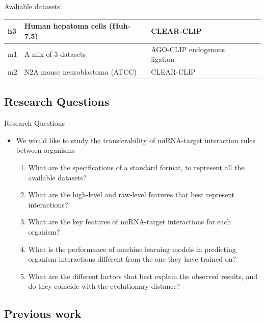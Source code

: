 \documentclass{beamer}
\begin{document}
\begin{frame}{Avaliable datasets}
\begin{table}[h!]
{\begin{tabular}{|l|p{5cm}|p{4cm}|l|}
    h3 &
	Human hepatoma cells (Huh-7.5) & 
	CLEAR-CLIP & 
	\cite{darnell_moore2015mirna} \\
	\hline
	
    m1 &
	A mix of 3 datasets & 
	AGO-CLIP endogenous ligation & 
	\cite{grosswendt2014unambiguous} \\
	\hline
	
    m2 &
	N2A mouse neuroblastoma (ATCC) & 
	CLEAR-CLIP & 
	\cite{darnell_moore2015mirna} \\
	\hline
\end{tabular}}
\end{table}


\end{frame}

\subsection{Research Questions}

\begin{frame}{Research Questions}
	\begin{itemize}

\item We would like to study the transferability of miRNA-target interaction rules between organisms
\begin{enumerate}
\item What are the specifications of a standard format, to represent all the available datasets?
\item What are the high-level and raw-level features that best represent interactions?
\item What are the key features of miRNA-target interactions for each organism?
\item What is the performance of machine learning models in predicting organism interactions different from the one they have trained on?
\item What are the different factors that best explain the observed results, and do they coincide with the evolutionary distance?
\end{enumerate}

	\end{itemize}
\end{frame}


\subsection{Previous work}
\end{document}
